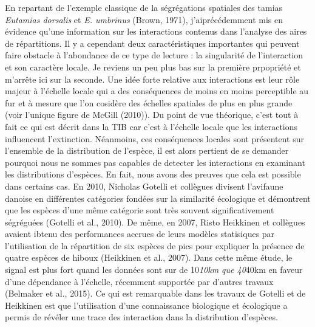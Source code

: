 En repartant de l'exemple classique de la ségrégations spatiales des
tamias \emph{Eutamias dorsalis} et \emph{E. umbrinus} (Brown, 1971),
j'aiprécédemment mis en évidence qu'une information sur les interactions
contenus dans l'analyse des aires de répartitions. Il y a cependant deux
caractéristiques importantes qui peuvent faire obstacle à l'abondance de
ce type de lecture : la singularité de l'interaction et son caractère
locale. Je reviens un peu plus bas sur la première prpopriété et
m'arrête ici sur la seconde. Une idée forte relative aux interactions
est leur rôle majeur à l'échelle locale qui a des conséquences de moins
en moins perceptible au fur et à mesure que l'on cosidère des échelles
spatiales de plus en plus grande (voir l'unique figure de McGill
(2010)). Du point de vue théorique, c'est tout à fait ce qui est décrit
dans la TIB car c'est à l'échelle locale que les interactions
influencent l'extinction. Néanmoins, ces conséquences locales sont
présentent sur l'ensemble de la distribution de l'espèce, il est alors
pertient de se demander pourquoi nous ne sommes pas capables de detecter
les interactions en examinant les distributions d'espèces. En fait, nous
avons des preuves que cela est possible dans certains cas. En 2010,
Nicholas Gotelli et collègues divisent l'avifaune danoise en différentes
catégories fondées sur la similarité écologique et démontrent que les
espèces d'une même catégorie sont très souvent significativement
ségréguées (Gotelli et al., 2010). De même, en 2007, Risto Heikkinen et
collègues avaient ibtenu des performances accrues de leurs modèles
statisiques par l'utilisation de la répartition de six espèces de pics
pour expliquer la présence de quatre espèces de hiboux (Heikkinen et
al., 2007). Dans cette même étude, le signal est plus fort quand les
données sont sur de 10\emph{10km que 40}40km en faveur d'une dépendance
à l'échelle, récemment supportée par d'autres travaux (Belmaker et al.,
2015). Ce qui est remarquable dans les travaux de Gotelli et de
Heikkinen est que l'utilisation d'une connaissance biologique et
écologique a permis de révéler une trace des interaction dans la
distribution d'espèces.

